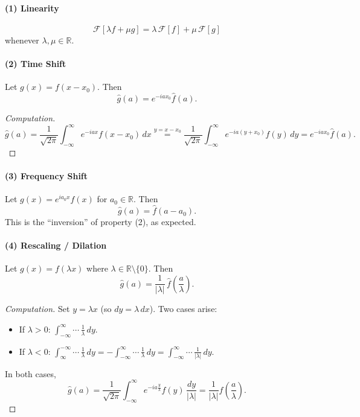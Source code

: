 \paragraph{(1) Linearity}
\[
\mathcal{F}[\lambda f + \mu g] = \lambda\,\mathcal{F}[f] + \mu\,\mathcal{F}[g]
\]
whenever $\lambda, \mu \in \mathbb{R}$.

\paragraph{(2) Time Shift}
Let $g(x) = f(x - x_0)$. Then
\[
\hat{g}(a) = e^{-iax_0}\hat{f}(a).
\]
\begin{proof}[Computation]
\[
\hat{g}(a)
= \frac{1}{\sqrt{2\pi}}\int_{-\infty}^{\infty} e^{-iax} f(x - x_0)\, dx
\overset{y = x - x_0}{=}
\frac{1}{\sqrt{2\pi}}\int_{-\infty}^{\infty} e^{-ia(y+x_0)} f(y)\, dy
= e^{-iax_0}\hat{f}(a).
\]
\end{proof}

\paragraph{(3) Frequency Shift}
Let $g(x) = e^{ia_0 x} f(x)$ for $a_0 \in \mathbb{R}$. Then
\[
\hat{g}(a) = \hat{f}(a - a_0).
\]
This is the ``inversion'' of property (2), as expected.

\paragraph{(4) Rescaling / Dilation}
Let $g(x) = f(\lambda x)$ where $\lambda \in \mathbb{R} \setminus \{0\}$. Then
\[
\hat{g}(a) = \frac{1}{|\lambda|}\,\hat{f}\!\left(\frac{a}{\lambda}\right).
\]

\begin{proof}[Computation]
Set $y = \lambda x$ (so $dy = \lambda\, dx$). Two cases arise:
\begin{itemize}
  \item If $\lambda > 0$: $\int_{-\infty}^{\infty} \cdots\, \frac{1}{\lambda}\, dy$.
  \item If $\lambda < 0$: $\int_{\infty}^{-\infty} \cdots\, \frac{1}{\lambda}\, dy = -\int_{-\infty}^{\infty} \cdots\, \frac{1}{\lambda}\, dy = \int_{-\infty}^{\infty} \cdots\, \frac{1}{|\lambda|}\, dy$.
\end{itemize}
In both cases,
\[
\hat{g}(a)
= \frac{1}{\sqrt{2\pi}}\int_{-\infty}^{\infty} e^{-ia\frac{y}{\lambda}} f(y)\,\frac{dy}{|\lambda|}
= \frac{1}{|\lambda|}\hat{f}\!\left(\frac{a}{\lambda}\right).
\]
\end{proof}

